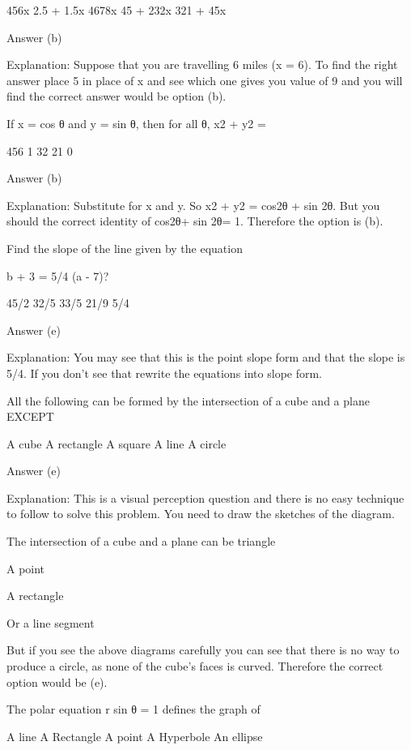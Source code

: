         456x
        2.5 + 1.5x
        4678x
        45 + 232x
        321 + 45x 

    Answer (b)

    Explanation: Suppose that you are travelling 6 miles (x = 6). To find the right answer place 5 in place of x and see which one gives you value of 9 and you will find the correct answer would be option (b).

    If x = cos θ and y = sin θ, then for all θ, x2 + y2 =

        456
        1
        32
        21
        0 

    Answer (b)

    Explanation: Substitute for x and y. So x2 + y2 = cos2θ + sin 2θ. But you should the correct identity of cos2θ+ sin 2θ= 1. Therefore the option is (b).

    Find the slope of the line given by the equation

    b + 3 = 5/4 (a - 7)?

        45/2
        32/5
        33/5
        21/9
        5/4 

    Answer (e)

    Explanation: You may see that this is the point slope form and that the slope is 5/4. If you don't see that rewrite the equations into slope form. 



    All the following can be formed by the intersection of a cube and a plane EXCEPT

        A cube
        A rectangle
        A square
        A line
        A circle 

    Answer (e)

    Explanation: This is a visual perception question and there is no easy technique to follow to solve this problem. You need to draw the sketches of the diagram.

    The intersection of a cube and a plane can be triangle

    A point

    A rectangle

    Or a line segment

    But if you see the above diagrams carefully you can see that there is no way to produce a circle, as none of the cube's faces is curved. Therefore the correct option would be (e).

    The polar equation r sin θ = 1 defines the graph of

        A line
        A Rectangle
        A point
        A Hyperbole
        An ellipse 

